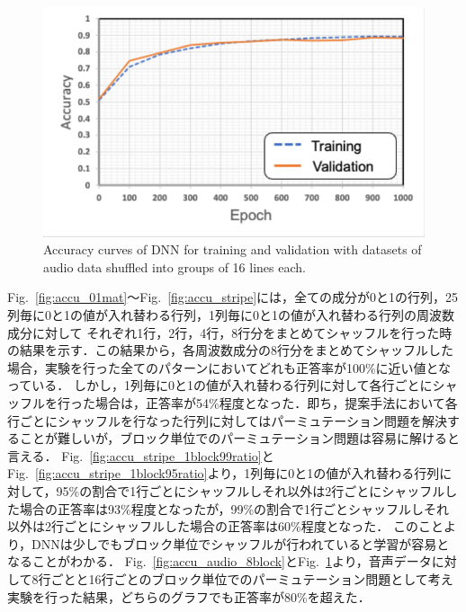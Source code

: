 \begin{figure}[t]
    \begin{center}
        \includegraphics[width=0.8\columnwidth]{figures/inkscape_graph_audio_16block.pdf}
    \end{center}
    \vspace{-8pt}
	\caption{Accuracy curves of DNN for training and validation with datasets of audio data shuffled into groups of 16 lines each.}
	\label{fig:accu_audio_16block}
\end{figure}


Fig.~\ref{fig:accu_01mat}〜Fig.~\ref{fig:accu_stripe}には，全ての成分が0と1の行列，25列毎に0と1の値が入れ替わる行列，1列毎に0と1の値が入れ替わる行列の周波数成分に対して
それぞれ1行，2行，4行，8行分をまとめてシャッフルを行った時の結果を示す．この結果から，各周波数成分の8行分をまとめてシャッフルした場合，実験を行った全てのパターンにおいてどれも正答率が100\%に近い値となっている．
しかし，1列毎に0と1の値が入れ替わる行列に対して各行ごとにシャッフルを行った場合は，正答率が54\%程度となった．即ち，提案手法において各行ごとにシャッフルを行なった行列に対してはパーミュテーション問題を解決することが難しいが，ブロック単位でのパーミュテーション問題は容易に解けると言える．
Fig.~\ref{fig:accu_stripe_1block99ratio}とFig.~\ref{fig:accu_stripe_1block95ratio}より，1列毎に0と1の値が入れ替わる行列に対して，95\%の割合で1行ごとにシャッフルしそれ以外は2行ごとにシャッフルした場合の正答率は93\%程度となったが，99\%の割合で1行ごとシャッフルしそれ以外は2行ごとにシャッフルした場合の正答率は60\%程度となった．
このことより，DNNは少しでもブロック単位でシャッフルが行われていると学習が容易となることがわかる．
Fig.~\ref{fig:accu_audio_8block}とFig.~\ref{fig:accu_audio_16block}より，音声データに対して8行ごとと16行ごとのブロック単位でのパーミュテーション問題として考え実験を行った結果，どちらのグラフでも正答率が80\%を超えた．



